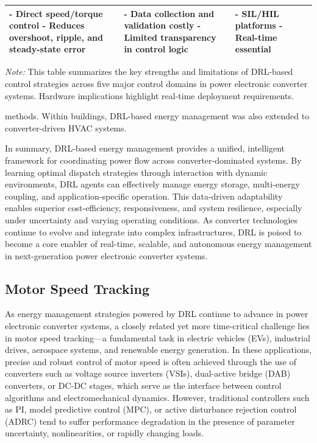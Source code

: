 \begin{table}[t]
\begin{tabular}{|p{2.5cm}|p{6.5cm}|p{4.5cm}|p{3.5cm}|}
- Direct speed/torque control \newline
- Reduces overshoot, ripple, and steady-state error & 
- Data collection and validation costly \newline
- Limited transparency in control logic & 
- SIL/HIL platforms \newline
- Real-time essential \\
\hline
\end{tabular}
\vspace{1mm}
\begin{tablenotes}
\small
\item \textit{Note:} This table summarizes the key strengths and limitations of DRL-based control strategies across five major control domains in power electronic converter systems. Hardware implications highlight real-time deployment requirements.
\end{tablenotes}
\end{table}

methods. Within buildings, DRL-based energy management was also extended to converter-driven HVAC systems.

In summary, DRL-based energy management provides a unified, intelligent framework for coordinating power flow across converter-dominated systems. By learning optimal dispatch strategies through interaction with dynamic environments, DRL agents can effectively manage energy storage, multi-energy coupling, and application-specific operation. This data-driven adaptability enables superior cost-efficiency, responsiveness, and system resilience, especially under uncertainty and varying operating conditions. As converter technologies continue to evolve and integrate into complex infrastructures, DRL is poised to become a core enabler of real-time, scalable, and autonomous energy management in next-generation power electronic converter systems.

\subsection{Motor Speed Tracking}
\label{sec:ctrl_motor}

As energy management strategies powered by DRL continue to advance in power electronic converter systems, a closely related yet more time-critical challenge lies in motor speed tracking—a fundamental task in electric vehicles (EVs), industrial drives, aerospace systems, and renewable energy generation. In these applications, precise and robust control of motor speed is often achieved through the use of converters such as voltage source inverters (VSIs), dual-active bridge (DAB) converters, or DC-DC stages, which serve as the interface between control algorithms and electromechanical dynamics. However, traditional controllers such as PI, model predictive control (MPC), or active disturbance rejection control (ADRC) tend to suffer performance degradation in the presence of parameter uncertainty, nonlinearities, or rapidly changing loads.

